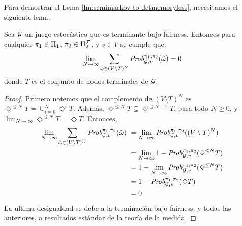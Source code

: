 Para demostrar el Lema \ref{lm:semimarkov-to-detmemoryless},  necesitamos el siguiente lema.



\begin{lemma}\label{lemma:sum-of-nonterminal-is-zero}
  Sea $\mathcal{G}$ un juego estocástico que es terminante bajo fairness.
  Entonces para cualquier $\pi_{1} \in \Pi_{1}$,
  $\pi_{2} \in \Pi^{\mathcal{F}}_{2}$, y $v \in V$ se cumple que:
  \[
  \lim_{N \to \infty} \sum_{\hat{\omega} \in (V \setminus T)^N} \mathit{Prob}^{\pi_{1}, \pi_{2}}_{\mathcal{G},v}(\hat{\omega}) = 0
  \]
  donde $T$ es el conjunto de nodos terminales de $\mathcal{G}$.
\end{lemma}
%
\begin{proof}
  Primero notemos que el complemento de $(V \setminus T)^N$ es
  $\Diamond^{\leq N} T = \cup^N_{i=0} \Diamond^i T$.
  Además, $\Diamond^{\leq N} T \subseteq \Diamond^{\leq N+1} T$, para todo $N\geq 0$,
  y $\lim_{N \to \infty} \Diamond^{\leq N} T = \Diamond T$.
  Entonces,
  \begin{align*}
    \lim_{N \to \infty} \sum_{\hat{\omega} \in (V \setminus T)^N} \mathit{Prob}^{\pi_{1}, \pi_{2}}_{\mathcal{G},v}(\hat{\omega}) \
    & = \lim_{N \to \infty} \mathit{Prob}^{\pi_{1}, \pi_{2}}_{\mathcal{G},v}((V \setminus T)^N) \\
    & = \lim_{N \to \infty} 1 - \mathit{Prob}^{\pi_{1}, \pi_{2}}_{\mathcal{G},v}(\Diamond^{\leq N} T ) \\
    & = 1 - \lim_{N \to \infty} \mathit{Prob}^{\pi_{1}, \pi_{2}}_{\mathcal{G},v}(\Diamond^{\leq N} T ) \\
    & = 1 - \mathit{Prob}^{\pi_{1}, \pi_{2}}_{\mathcal{G},v}(\Diamond T ) \\
    & = 0
  \end{align*}
  La ultima desigualdad se debe a la terminación bajo fairness, y todas las anteriores, a resultados estándar de la teoría de la medida.

\end{proof}
